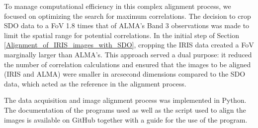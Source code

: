 \documentclass[a4paper,alpha-refs]{eSpectra}
\begin{document}

To manage computational efficiency in this complex alignment process, we focused on optimizing the search for maximum correlations. The decision to crop SDO data to a FoV 1.8 times that of ALMA's Band 3 observations was made to limit the spatial range for potential correlations. In the initial step of Section \ref{Alignment_of_IRIS_images_with_SDO}, cropping the IRIS data created a FoV marginally larger than ALMA's. This approach served a dual purpose: it reduced the number of correlation calculations and ensured that the images to be aligned (IRIS and ALMA) were smaller in arcsecond dimensions compared to the SDO data, which acted as the reference in the alignment process.

 
The data acquisition and image alignment process was implemented in Python. The documentation of the programs used as well as the script used to align the images is available on GitHub \cite{gibhub_reporsitory_alignment} together with a guide for the use of the program.
\end{document}
